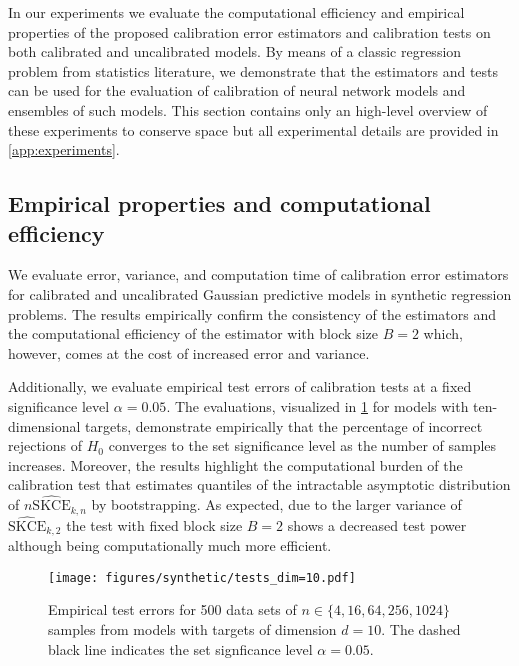 \documentclass{article}
\begin{document}
In our experiments we evaluate the computational efficiency and empirical properties
of the proposed calibration error estimators and calibration tests on both calibrated
and uncalibrated models. By means of a classic regression problem from statistics
literature, we demonstrate that the estimators and tests can be used for the
evaluation of calibration of neural network models and ensembles of such models. This
section contains only an high-level overview of these experiments to conserve space but
all experimental details are provided in \cref{app:experiments}.

\subsection{Empirical properties and computational efficiency}

We evaluate error, variance, and computation time of calibration error
estimators for calibrated and uncalibrated Gaussian predictive models in synthetic
regression problems. The results empirically confirm the
consistency of the estimators and the computational efficiency of the estimator with
block size $B = 2$ which, however, comes at the cost of increased error and variance.

Additionally, we evaluate empirical test errors of calibration tests
at a fixed significance level $\alpha = 0.05$. The evaluations, visualized in
\cref{fig:synthetic_tests_10_main} for models with ten-dimensional targets, demonstrate
empirically that the percentage of incorrect rejections of $H_0$ converges to the set
significance level as the number of samples increases.
Moreover, the results highlight the computational burden of the calibration test
that estimates quantiles of the intractable asymptotic distribution of
$n\widehat{\mathrm{SKCE}}_{k,n}$ by bootstrapping. As expected, due to the larger
variance of $\widehat{\mathrm{SKCE}}_{k,2}$ the test with fixed block size $B = 2$
shows a decreased test power although being computationally much more efficient.

\begin{figure}[!hbtp]
    \centering
    \texttt{[image: figures/synthetic/tests\_dim=10.pdf]}
    \caption{Empirical test errors for 500 data sets of $n \in \{4, 16, 64, 256, 1024\}$
    samples from models with targets of dimension $d = 10$. The dashed black line
    indicates the set signficance level $\alpha = 0.05$.}%
    \label{fig:synthetic_tests_10_main}
\end{figure}
\end{document}
